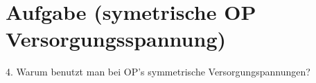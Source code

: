 \section{Aufgabe (symetrische OP Versorgungsspannung)}%
\label{sec:aufgabe_4}

4. Warum benutzt man bei OP's symmetrische Versorgungspannungen?


